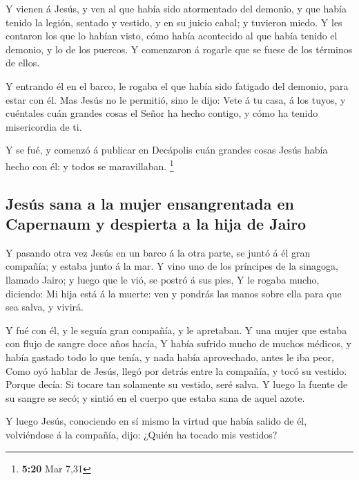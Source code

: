  Y vienen á Jesús, y ven al que había sido atormentado del
demonio, y que había tenido la legión, sentado y vestido, y en su juicio
cabal; y tuvieron miedo.  Y les contaron los que lo habían
visto, cómo había acontecido al que había tenido el demonio, y lo de los
puercos.  Y comenzaron á rogarle que se fuese de los
términos de ellos.

 Y entrando él en el barco, le rogaba el que había sido
fatigado del demonio, para estar con él.  Mas Jesús no le
permitió, sino le dijo: Vete á tu casa, á los tuyos, y cuéntales cuán
grandes cosas el Señor ha hecho contigo, y cómo ha tenido misericordia
de ti.

 Y se fué, y comenzó á publicar en Decápolis cuán grandes
cosas Jesús había hecho con él: y todos se maravillaban. \footnote{\textbf{5:20}
  Mar 7,31}

\hypertarget{jesuxfas-sana-a-la-mujer-ensangrentada-en-capernaum-y-despierta-a-la-hija-de-jairo}{%
\subsection{Jesús sana a la mujer ensangrentada en Capernaum y despierta
a la hija de
Jairo}\label{jesuxfas-sana-a-la-mujer-ensangrentada-en-capernaum-y-despierta-a-la-hija-de-jairo}}

 Y pasando otra vez Jesús en un barco á la otra parte, se
juntó á él gran compañía; y estaba junto á la mar.  Y vino
uno de los príncipes de la sinagoga, llamado Jairo; y luego que le vió,
se postró á sus pies,  Y le rogaba mucho, diciendo: Mi hija
está á la muerte: ven y pondrás las manos sobre ella para que sea salva,
y vivirá.

 Y fué con él, y le seguía gran compañía, y le apretaban.
 Y una mujer que estaba con flujo de sangre doce años
hacía,  Y había sufrido mucho de muchos médicos, y había
gastado todo lo que tenía, y nada había aprovechado, antes le iba peor,
 Como oyó hablar de Jesús, llegó por detrás entre la
compañía, y tocó su vestido.  Porque decía: Si tocare tan
solamente su vestido, seré salva.  Y luego la fuente de su
sangre se secó; y sintió en el cuerpo que estaba sana de aquel azote.

 Y luego Jesús, conociendo en sí mismo la virtud que había
salido de él, volviéndose á la compañía, dijo: ¿Quién ha tocado mis
vestidos?

